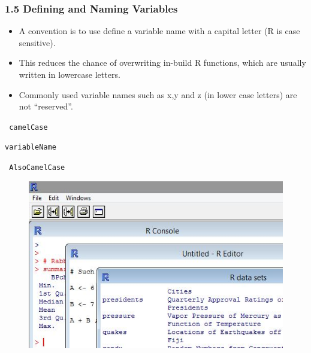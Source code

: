 \documentclass{beamer}
\begin{document}
 	\begin{frame}
 		\frametitle{1.5 Defining and Naming Variables}
 		\begin{itemize}
 			\item A convention is to use define a variable name with a capital letter (R is case sensitive). 
 			\item This
 			reduces the chance of overwriting in-build R functions, which are usually written in lowercase
 			letters. 
 			\item Commonly used variable names such as x,y and z (in lower case letters) are not “reserved”.
 		\end{itemize}
 		
 		\begin{framed}
 			\texttt{	camelCase}
 			
 			\texttt{variableName}
 			
 			\texttt{	AlsoCamelCase}
 		\end{framed}
 	\end{frame}
 	\begin{frame}
 		\begin{figure}
 			\centering
 			\includegraphics[width=1.2\linewidth]{images/Rmultiplewindows}
 		\end{figure}
 		
 	\end{frame}   
\end{document}
